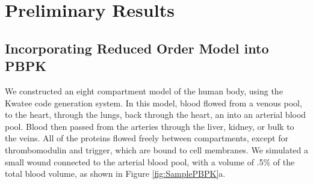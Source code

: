 \documentclass[12pt]{article}
\begin{document}
\section*{Preliminary Results}
\subsection*{Incorporating Reduced Order Model into PBPK}
We constructed an eight compartment model of the human body, using the Kwatee code generation system. In this model, blood flowed from a venous pool, to the heart, through the lungs, back through the heart, an into an arterial blood pool. Blood then passed from the arteries through the liver, kidney, or bulk to the veins. All of the proteins flowed freely between compartments, except for thrombomodulin and trigger, which are bound to cell membranes.\cite{esmon1989roles} We simulated a small wound connected to the arterial blood pool, with a volume of .5\% of the total blood volume, as shown in Figure \ref{fig:SamplePBPK}a.
\end{document}
